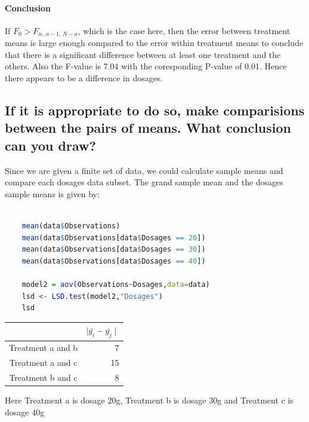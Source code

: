\documentclass[11pt]{article}
\begin{document}
\paragraph{Conclusion}
If $\displaystyle F_{0}>F_{\alpha ,\,a-1,\,N-a}$, which is the case here, then the error between treatment means is large enough compared to the error within treatment means to conclude that there is a significant difference between at least one treatment and the others. Also the F-value is 7.04 with the coresponding P-value of 0.01. Hence there appears to be a difference in dosages.

\subsection{If it is appropriate to do so, make comparisions between the pairs of means. What conclusion can you draw?}

Since we are given a finite set of data, we could calculate sample means and compare each dosages data subset. The grand sample mean and the dosages sample means is given by: 

\begin{lstlisting}[language=R]
    
    mean(data$Observations)
    mean(data$Observations[data$Dosages == 20])
    mean(data$Observations[data$Dosages == 30])
    mean(data$Observations[data$Dosages == 40])

    model2 = aov(Observations~Dosages,data=data)    
    lsd <- LSD.test(model2,"Dosages")
    lsd

\end{lstlisting}

\clearpage



\begin{center}
    \begin{tabular}{ | c | r |}
      \hline
                         & $\displaystyle \mid \bar{y_i} - \bar{y_j} \mid$ \\ \hline
       Treatment a and b & 7 \\ \hline
       Treatment a and c & \cellcolor{gray!30}15 \\ \hline
       Treatment b and c & 8 \\ \hline
    \end{tabular}
\end{center}
Here Treatment a is dosage 20g, Treatment b is dosage 30g and Treatment c is dosage 40g
\end{document}
